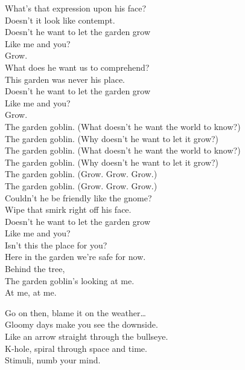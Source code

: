 What's that expression upon his face? \\
Doesn't it look like contempt. \\
Doesn't he want to let the garden grow \\
Like me and you? \\
Grow. \\

What does he want us to comprehend? \\
This garden was never his place. \\
Doesn't he want to let the garden grow \\
Like me and you? \\
Grow. \\

The garden goblin. (What doesn't he want the world to know?) \\
The garden goblin. (Why doesn't he want to let it grow?) \\
The garden goblin. (What doesn't he want the world to know?) \\
The garden goblin. (Why doesn't he want to let it grow?) \\
The garden goblin. (Grow. Grow. Grow.) \\
The garden goblin. (Grow. Grow. Grow.) \\

Couldn't he be friendly like the gnome? \\
Wipe that smirk right off his face. \\
Doesn't he want to let the garden grow \\
Like me and you? \\

Isn't this the place for you? \\
Here in the garden we're safe for now. \\
Behind the tree, \\
The garden goblin's looking at me. \\
At me, at me. \\





Go on then, blame it on the weather… \\

Gloomy days make you see the downside. \\
Like an arrow straight through the bullseye. \\
K-hole, spiral through space and time. \\
Stimuli, numb your mind. \\

